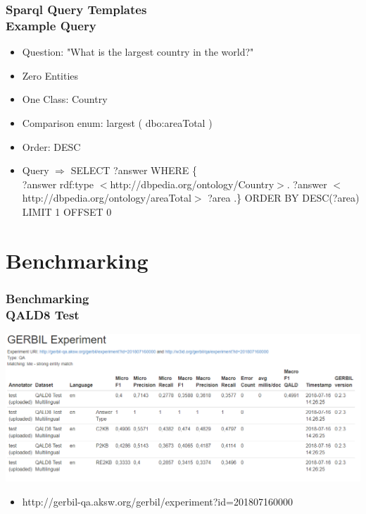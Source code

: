 \documentclass{beamer}
\newcommand\tab[1][1cm]{\hspace*{#1}}
\begin{document}
\begin{frame}
\frametitle{Sparql Query Templates \\ {\normalsize Example Query}}
\begin{example}[largest]
	\begin{itemize}
		\item Question: "What is the largest country in the world?"
		\item Zero Entities
		\item One Class: Country
		\item Comparison enum: largest ( dbo:areaTotal )
		\item Order: DESC 
		\item Query $\Rightarrow$ SELECT ?answer WHERE \{ \\
		\tab[1.4cm] 	?answer rdf:type $<$http://dbpedia.org/ontology/Country$>$. 
		\tab[1.4cm] 	?answer  $<$http://dbpedia.org/ontology/areaTotal$>$ ?area .\} 
		\tab[1.4cm] 	ORDER BY DESC(?area) LIMIT 1 OFFSET 0

	\end{itemize}
\end{example}
\end{frame}


\section{Benchmarking}

\begin{frame}
\frametitle{Benchmarking \\ {\normalsize QALD8 Test}}
\begin{center}
	\includegraphics[scale=0.38]{QALD-8-Test.PNG}
\end{center}

\begin{itemize}
	\item  http://gerbil-qa.aksw.org/gerbil/experiment?id=201807160000
\end{itemize}
\end{frame}
\end{document}
